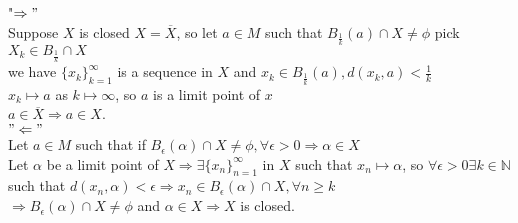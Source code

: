 \documentclass{amsbook}
\begin{document}
\begin{tcolorbox}[enhanced,attach boxed title to top center={yshift=-3mm,yshifttext=-1mm},
  colback=blue!5!white,colframe=blue!75!black,colbacktitle=red!80!black,
  title={Exercise 39.10:},fonttitle=\bfseries,
  boxed title style={size=small,colframe=red!50!black} ]
  {\color{red}{Proof:}}  
{\color{red} "$\Rightarrow"$}\\
Suppose $X$ is closed $X=\overline{X}$, so let $a\in M$ such that $B_\frac{1}{k}(a)\cap X\neq\phi$ pick $X_k\in 
B_\frac{1}{k}\cap X$\\
we have $\{x_k\}_{k=1}^\infty$ is a sequence in $X$ and $x_k\in B_\frac{1}{k}(a),d(x_k,a)<\frac{1}{k}$\\
$x_k\mapsto a$ as $k\mapsto\infty$, so $a$ is a limit point of $x$\\
$a\in\overline{X}\Rightarrow a\in X$.\\
{\color{red}$"\Leftarrow"$}\\
Let $a\in M$ such that if $B_\epsilon(\alpha)\cap X\neq \phi,\forall \epsilon>0\Rightarrow \alpha\in X$\\
Let $\alpha$ be a limit point of $X\Rightarrow\exists\{x_n\}_{n=1}^\infty$ in $X$ such that $x_n\mapsto\alpha$, 
so $\forall\epsilon>0\exists k\in\mathbb{N}$ such that $d(x_n,\alpha)<\epsilon\Rightarrow x_n\in 
B_\epsilon(\alpha)\cap X,\forall n\geq k$\\
$\Rightarrow B_\epsilon(\alpha)\cap X\neq \phi$ and $\alpha\in X\Rightarrow X$ is closed.
\end{tcolorbox}
\end{document}
